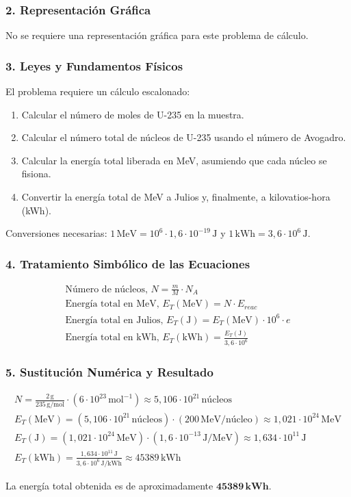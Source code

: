 \subsubsection*{2. Representación Gráfica}
No se requiere una representación gráfica para este problema de cálculo.

\subsubsection*{3. Leyes y Fundamentos Físicos}
El problema requiere un cálculo escalonado:
\begin{enumerate}
    \item Calcular el número de moles de U-235 en la muestra.
    \item Calcular el número total de núcleos de U-235 usando el número de Avogadro.
    \item Calcular la energía total liberada en MeV, asumiendo que cada núcleo se fisiona.
    \item Convertir la energía total de MeV a Julios y, finalmente, a kilovatios-hora (kWh).
\end{enumerate}
Conversiones necesarias: $1\,\text{MeV} = 10^6 \cdot 1,6 \cdot 10^{-19}\,\text{J}$ y $1\,\text{kWh} = 3,6 \cdot 10^6\,\text{J}$.

\subsubsection*{4. Tratamiento Simbólico de las Ecuaciones}
\begin{gather}
    \text{Número de núcleos, } N = \frac{m}{M} \cdot N_A \\
    \text{Energía total en MeV, } E_T(\text{MeV}) = N \cdot E_{reac} \\
    \text{Energía total en Julios, } E_T(\text{J}) = E_T(\text{MeV}) \cdot 10^6 \cdot e \\
    \text{Energía total en kWh, } E_T(\text{kWh}) = \frac{E_T(\text{J})}{3,6 \cdot 10^6}
\end{gather}

\subsubsection*{5. Sustitución Numérica y Resultado}
\begin{gather}
    N = \frac{2\,\text{g}}{235\,\text{g/mol}} \cdot (6 \cdot 10^{23}\,\text{mol}^{-1}) \approx 5,106 \cdot 10^{21}\,\text{núcleos} \\
    E_T(\text{MeV}) = (5,106 \cdot 10^{21}\,\text{núcleos}) \cdot (200\,\text{MeV/núcleo}) \approx 1,021 \cdot 10^{24}\,\text{MeV} \\
    E_T(\text{J}) = (1,021 \cdot 10^{24}\,\text{MeV}) \cdot (1,6 \cdot 10^{-13}\,\text{J/MeV}) \approx 1,634 \cdot 10^{11}\,\text{J} \\
    E_T(\text{kWh}) = \frac{1,634 \cdot 10^{11}\,\text{J}}{3,6 \cdot 10^6\,\text{J/kWh}} \approx 45389\,\text{kWh}
\end{gather}
\begin{cajaresultado}
La energía total obtenida es de aproximadamente $\boldsymbol{45389\,\textbf{kWh}}$.
\end{cajaresultado}

